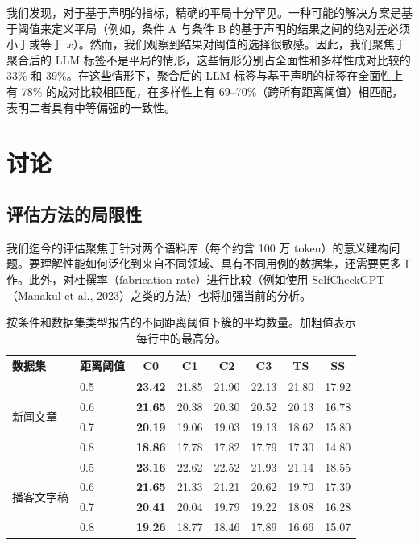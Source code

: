 \documentclass[11pt,UTF8,fontset=fandol]{ctexart}
\begin{document}
我们发现，对于基于声明的指标，精确的平局十分罕见。一种可能的解决方案是基于阈值来定义平局（例如，条件 A 与条件 B 的基于声明的结果之间的绝对差必须小于或等于 $x$）。然而，我们观察到结果对阈值的选择很敏感。因此，我们聚焦于聚合后的 LLM 标签不是平局的情形，这些情形分别占全面性和多样性成对比较的 33\% 和 39\%。在这些情形下，聚合后的 LLM 标签与基于声明的标签在全面性上有 78\% 的成对比较相匹配，在多样性上有 69--70\%（跨所有距离阈值）相匹配，表明二者具有中等偏强的一致性。

\section{讨论}

\subsection{评估方法的局限性}

我们迄今的评估聚焦于针对两个语料库（每个约含 100 万 token）的意义建构问题。要理解性能如何泛化到来自不同领域、具有不同用例的数据集，还需要更多工作。此外，对杜撰率（fabrication rate）进行比较（例如使用 SelfCheckGPT（Manakul et al., 2023）之类的方法）也将加强当前的分析。

\begin{table}[H]\centering
\caption{按条件和数据集类型报告的不同距离阈值下簇的平均数量。加粗值表示每行中的最高分。}
\label{tab:4}
\small
\renewcommand{\arraystretch}{1.15}
\begin{tabular}{@{}llcccccc@{}}
\toprule
\textbf{数据集} & \textbf{距离阈值} & C0 & C1 & C2 & C3 & TS & SS \\
\midrule
\multirow{4}{*}{新闻文章}
 & 0.5 & \textbf{23.42} & 21.85 & 21.90 & 22.13 & 21.80 & 17.92 \\
 & 0.6 & \textbf{21.65} & 20.38 & 20.30 & 20.52 & 20.13 & 16.78 \\
 & 0.7 & \textbf{20.19} & 19.06 & 19.03 & 19.13 & 18.62 & 15.80 \\
 & 0.8 & \textbf{18.86} & 17.78 & 17.82 & 17.79 & 17.30 & 14.80 \\
\midrule
\multirow{4}{*}{播客文字稿}
 & 0.5 & \textbf{23.16} & 22.62 & 22.52 & 21.93 & 21.14 & 18.55 \\
 & 0.6 & \textbf{21.65} & 21.33 & 21.21 & 20.62 & 19.70 & 17.39 \\
 & 0.7 & \textbf{20.41} & 20.04 & 19.79 & 19.22 & 18.08 & 16.28 \\
 & 0.8 & \textbf{19.26} & 18.77 & 18.46 & 17.89 & 16.66 & 15.07 \\
\bottomrule
\end{tabular}
\end{table}
\end{document}
